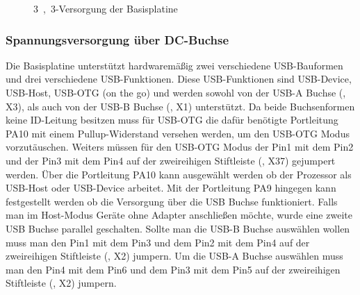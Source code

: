 \begin{figure}[htb]
    \centering
    \qquad
    \qquad
    \caption[\unit{3,3}{\volt}-Versorgung der Basisplatine]{\unit{3,3}{\volt}-Versorgung der \gls{Basisplatine}}
    \label{fig:basisplatine-3v3}
\end{figure}

\subsubsection{Spannungsversorgung über DC-Buchse}
Die \gls{Basisplatine} unterstützt hardwaremäßig zwei verschiedene USB-Bauformen und drei verschiedene USB-Funktionen. Diese USB-Funktionen sind USB-Device, USB-Host, USB-OTG (on the go) und werden sowohl von der USB-A Buchse (, X3), als auch von der USB-B Buchse (, X1) unterstützt. Da beide Buchsenformen keine ID-Leitung besitzen muss für USB-OTG die dafür benötigte Portleitung PA10 mit einem Pullup-Widerstand versehen werden, um den USB-OTG Modus vorzutäuschen. Weiters müssen für den USB-OTG Modus der Pin1 mit dem Pin2 und der Pin3 mit dem Pin4 auf der zweireihigen Stiftleiste (, X37) gejumpert werden. Über die Portleitung PA10 kann ausgewählt werden ob der Prozessor als USB-Host oder USB-Device arbeitet. Mit der Portleitung PA9 hingegen kann festgestellt werden ob die Versorgung über die USB Buchse funktioniert. Falls man im Host-Modus Geräte ohne Adapter anschließen möchte, wurde eine zweite USB Buchse parallel geschalten.  Sollte man die USB-B Buchse auswählen wollen muss man den Pin1 mit dem Pin3 und dem Pin2 mit dem Pin4 auf der zweireihigen Stiftleiste (, X2) jumpern. Um die USB-A Buchse auswählen muss man den Pin4 mit dem Pin6 und dem Pin3 mit dem Pin5 auf der zweireihigen Stiftleiste (, X2) jumpern.


